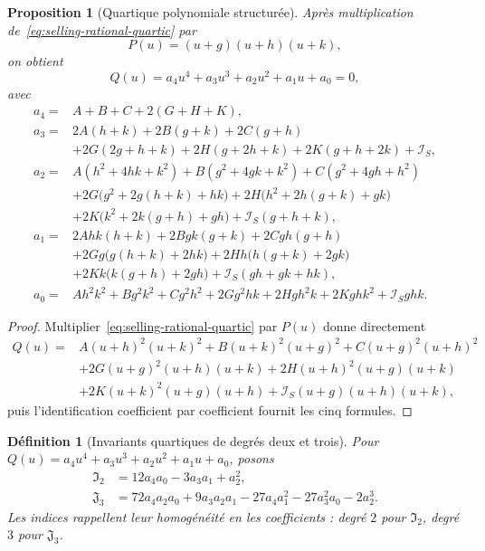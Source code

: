 \documentclass[11pt,a4paper]{article}
\newtheorem{proposition}[theorem]{Proposition}
\newtheorem{definition}[theorem]{Définition}
\begin{document}
\begin{proposition}[Quartique polynomiale structurée]\label{prop:selling-structured-quartic}
Après multiplication de~\eqref{eq:selling-rational-quartic} par
\[
 P(u)=(u+g)(u+h)(u+k),
\]
on obtient
\[
 Q(u)=a_4u^4+a_3u^3+a_2u^2+a_1u+a_0=0,
\]
avec
\begin{align*}
a_4={}&A+B+C+2(G+H+K),\\
a_3={}&2A(h+k)+2B(g+k)+2C(g+h)\\
&+2G(2g+h+k)+2H(g+2h+k)+2K(g+h+2k)+\mathcal I_S,\\
a_2={}&A(h^2+4hk+k^2)+B(g^2+4gk+k^2)+C(g^2+4gh+h^2)\\
&+2G\bigl(g^2+2g(h+k)+hk\bigr)
 +2H\bigl(h^2+2h(g+k)+gk\bigr)\\
&+2K\bigl(k^2+2k(g+h)+gh\bigr)+\mathcal I_S(g+h+k),\\
a_1={}&2Ahk(h+k)+2Bgk(g+k)+2Cgh(g+h)\\
&+2Gg\bigl(g(h+k)+2hk\bigr)
 +2Hh\bigl(h(g+k)+2gk\bigr)\\
&+2Kk\bigl(k(g+h)+2gh\bigr)+\mathcal I_S(gh+gk+hk),\\
a_0={}&Ah^2k^2+Bg^2k^2+Cg^2h^2+2Gg^2hk+2Hgh^2k+2Kghk^2+\mathcal I_Sghk.
\end{align*}
\end{proposition}

\begin{proof}
Multiplier~\eqref{eq:selling-rational-quartic} par $P(u)$ donne directement
\begin{align*}
Q(u)={}&A(u+h)^2(u+k)^2+B(u+k)^2(u+g)^2+C(u+g)^2(u+h)^2\\
&+2G(u+g)^2(u+h)(u+k)+2H(u+h)^2(u+g)(u+k)\\
&+2K(u+k)^2(u+g)(u+h)+\mathcal I_S(u+g)(u+h)(u+k),
\end{align*}
puis l'identification coefficient par coefficient fournit les cinq formules.
\end{proof}

\begin{definition}[Invariants quartiques de degrés deux et trois]\label{def:quartic-IJ}
Pour $Q(u)=a_4u^4+a_3u^3+a_2u^2+a_1u+a_0$, posons
\begin{align}
 \mathfrak I_2&=12a_4a_0-3a_3a_1+a_2^2,\label{eq:I2quartic}\\
 \mathfrak J_3&=72a_4a_2a_0+9a_3a_2a_1-27a_4a_1^2-27a_3^2a_0-2a_2^3.\label{eq:J3quartic}
\end{align}
Les indices rappellent leur homogénéité en les coefficients : degré $2$ pour $\mathfrak I_2$, degré $3$ pour $\mathfrak J_3$.
\end{definition}
\end{document}
